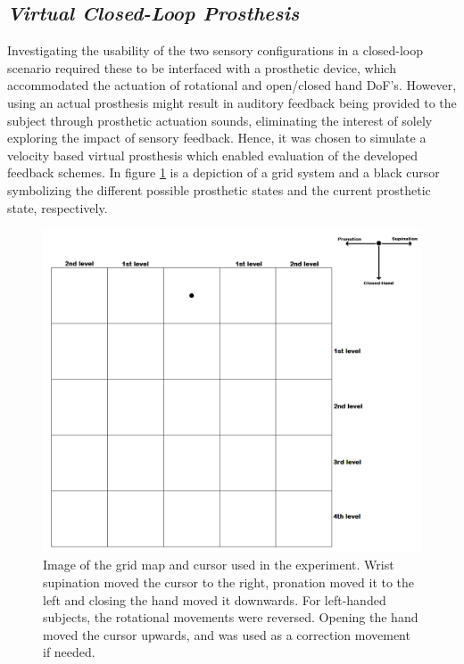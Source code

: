 

\subsection{\textit{Virtual Closed-Loop Prosthesis}}

Investigating the usability of the two sensory configurations in a closed-loop scenario required these to be interfaced with a prosthetic device, which accommodated the actuation of rotational and open/closed hand DoF's. However, using an actual prosthesis might result in auditory feedback being provided to the subject through prosthetic actuation sounds, eliminating the interest of solely exploring the impact of sensory feedback. Hence, it was chosen to simulate a velocity based virtual prosthesis which enabled evaluation of the developed feedback schemes. In figure \ref{fig:pa:gridmap} is a depiction of a grid system and a black cursor symbolizing the different possible prosthetic states and the current prosthetic state, respectively.
\begin{figure}[H]                 
	\includegraphics[width=1\textwidth]{figures/gridmap2}  
	\caption{Image of the grid map and cursor used in the experiment. Wrist supination moved the cursor to the right, pronation moved it to the left and closing the hand moved it downwards. For left-handed subjects, the rotational movements were reversed. Opening the hand moved the cursor upwards, and was used as a correction movement if needed.}
	\label{fig:pa:gridmap} 
\end{figure}
